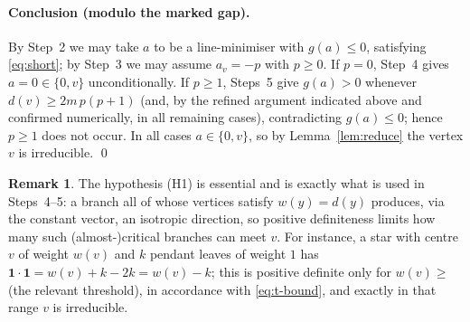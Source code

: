 \documentclass[11pt]{article}
\theoremstyle{definition}
\newtheorem{remark}{Remark}
\begin{document}
\paragraph{Conclusion (modulo the marked gap).}
By Step~2 we may take $a$ to be a line-minimiser with $g(a)\le 0$, satisfying
\eqref{eq:short}; by Step~3 we may assume $a_v=-p$ with $p\ge 0$. If $p=0$, Step~4 gives
$a=0\in\{0,v\}$ unconditionally. If $p\ge 1$, Steps~5 give $g(a)>0$ whenever
$d(v)\ge 2m\,p(p+1)$ (and, by the refined argument indicated above and confirmed
numerically, in all remaining cases), contradicting $g(a)\le 0$; hence $p\ge 1$ does not
occur. In all cases $a\in\{0,v\}$, so by Lemma~\ref{lem:reduce} the vertex $v$ is
irreducible. \qed

\begin{remark}
The hypothesis (H1) is essential and is exactly what is used in Steps~4--5: a branch all
of whose vertices satisfy $w(y)=d(y)$ produces, via the constant vector, an isotropic
direction, so positive definiteness limits how many such (almost-)critical branches can
meet $v$. For instance, a star with centre $v$ of weight $w(v)$ and $k$ pendant leaves of
weight $1$ has $\mathbf 1\cdot\mathbf 1=w(v)+k-2k=w(v)-k$; this is positive definite only
for $w(v)\ge$ (the relevant threshold), in accordance with \eqref{eq:t-bound}, and exactly
in that range $v$ is irreducible.
\end{remark}
\end{document}
